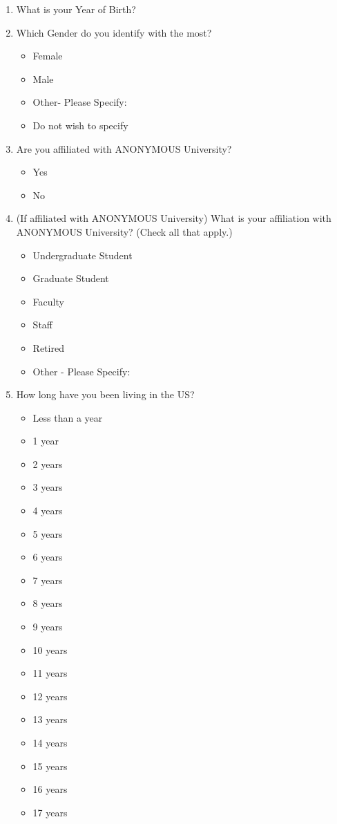 \begin{enumerate}
\item What is your Year of Birth?
\item Which Gender do you identify with the most?
\begin{itemize}
\item Female
\item Male
\item Other- Please Specify:
\item Do not wish to specify
\end{itemize}
\item Are you affiliated with ANONYMOUS University?
\begin{itemize}
\item Yes
\item No
\end{itemize}
\item (If affiliated with ANONYMOUS University) What is your affiliation with ANONYMOUS University? (Check all that apply.)
\begin{itemize}
\item Undergraduate Student
\item Graduate Student
\item Faculty
\item Staff
\item Retired
\item Other - Please Specify:
\end{itemize}
\item How long have you been living in the US?
\begin{itemize}
\item Less than a year
\item 1 year
\item 2 years
\item 3 years
\item 4 years
\item 5 years
\item 6 years
\item 7 years
\item 8 years
\item 9 years
\item 10 years
\item 11 years
\item 12 years
\item 13 years
\item 14 years
\item 15 years
\item 16 years
\item 17 years

\end{itemize}
\end{enumerate}
